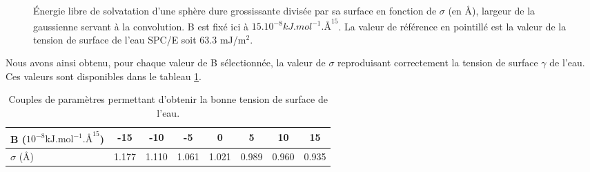 \begin{figure}[H]
\center
	\caption[\'Energie libre de solvatation d'une sphère dure grossissante divisée par sa surface en fonction de $\sigma$.]{\'Energie libre de solvatation d'une sphère dure grossissante divisée par sa surface en fonction de $\sigma$ (en \AA), largeur de la gaussienne servant à la convolution. B est fixé ici à $15.10^{-8} kJ.mol^{-1}.\text{\AA}^{15}$. La valeur de référence en pointillé est la valeur de la tension de surface de l'eau SPC/E soit 63.3 mJ/m$^2$\cite{vega_surface_2007}.}
    \label{fig:etude_sigma}
\end{figure}


Nous avons ainsi obtenu, pour chaque valeur de B sélectionnée, la valeur de $\sigma$ reproduisant correctement la tension de surface $\gamma$ de l'eau. Ces valeurs sont disponibles dans le tableau \ref{tab:parametres_bridge}.

\begin{table}[H]
 \centering
  \begin{tabular}{l || c c c c c c c}
    \hline
    B ($10^{-8} \mathrm{kJ.mol}^{-1}.\text{\AA}^{15}$)  & -15 & -10 & -5 & 0 & 5 & 10 & 15  \\
    \hline
     $\sigma$ (\AA)  & 1.177 & 1.110 & 1.061 & 1.021 & 0.989 & 0.960 & 0.935  \\
    \hline
  \end{tabular}
  \caption{Couples de paramètres permettant d'obtenir la bonne tension de surface de l'eau.}
  \label{tab:parametres_bridge}  
\end{table}

